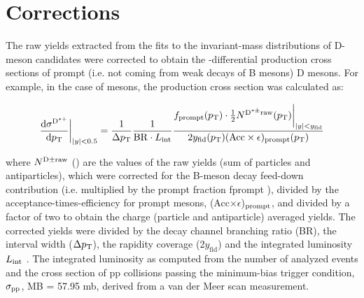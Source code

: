 \linenumbers

\section{Corrections}
\label{sec:eff}


The raw yields extracted from the fits to the invariant-mass distributions of D-meson candidates were
corrected to obtain the \pt -differential production cross sections of prompt (i.e. not coming from weak
decays of B mesons) D mesons. For example, in the case of \Dstar mesons, the production cross section
was calculated as:

\begin{equation}
 \label{eq:effMethod}
 \frac{\mathrm{d}\sigma^{\rm D^{\ast +}}}{\mathrm{d}p_{\mathrm{T}}}\bigg\rvert_{|y|<0.5} = \frac{1}{\Delta p_{\mathrm{T}}} \frac{1}{\mathrm{BR} \cdot {L_{\rm int}}} \frac{f_{\mathrm{prompt}}(p_{\mathrm{T}})\cdot \frac{1}{2} N^{\mathrm{D^{\ast \pm}raw}}(p_{\mathrm{T}})\bigg\rvert_{|y| < y_{\mathrm{fid}}}}{ 2y_{\rm fid}(p_{\rm T})(\mathrm{Acc}\times\epsilon)_{\mathrm{prompt}}(p_{\mathrm{T}})  }
\end{equation}


where $N^{\rm D{\pm \rm raw}}$ (\pt) are the values of the raw yields (sum of particles and antiparticles), which were corrected for the B-meson decay feed-down contribution (i.e. multiplied by the prompt fraction fprompt ),
divided by the acceptance-times-efficiency for prompt \Dstar mesons, (Acc$\times \epsilon$)$_{\rm prompt}$, and divided by a factor of two to obtain the charge (particle and antiparticle) averaged yields. The corrected yields were divided by the decay channel branching ratio (BR), the \pt interval width ($\Delta p_{\rm T}$), the rapidity coverage (2$y_{\mathrm{fid}}$) and the integrated luminosity $L_{\rm int}$ . The integrated luminosity as computed from the number of analyzed events and the cross section of pp collisions passing the minimum-bias trigger condition, $\sigma_{\rm pp}$, MB = 57.95 mb, derived from a van der Meer scan measurement.

